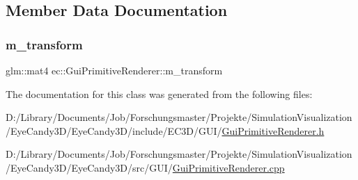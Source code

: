 \subsection{Member Data Documentation}
\mbox{\label{classec_1_1_gui_primitive_renderer_a7ebd149e4d4e0b043d928391041000bf}} 
\subsubsection{\texorpdfstring{m\+\_\+transform}{m\_transform}}
{\footnotesize\ttfamily glm\+::mat4 ec\+::\+Gui\+Primitive\+Renderer\+::m\+\_\+transform\hspace{0.3cm}{\ttfamily [protected]}}



The documentation for this class was generated from the following files\+:\begin{DoxyCompactItemize}
\item 
D\+:/\+Library/\+Documents/\+Job/\+Forschungsmaster/\+Projekte/\+Simulation\+Visualization/\+Eye\+Candy3\+D/\+Eye\+Candy3\+D/include/\+E\+C3\+D/\+G\+U\+I/\mbox{\hyperlink{_gui_primitive_renderer_8h}{Gui\+Primitive\+Renderer.\+h}}\item 
D\+:/\+Library/\+Documents/\+Job/\+Forschungsmaster/\+Projekte/\+Simulation\+Visualization/\+Eye\+Candy3\+D/\+Eye\+Candy3\+D/src/\+G\+U\+I/\mbox{\hyperlink{_gui_primitive_renderer_8cpp}{Gui\+Primitive\+Renderer.\+cpp}}\end{DoxyCompactItemize}

